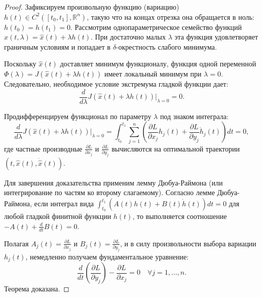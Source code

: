 \begin{proof}
    Зафиксируем произвольную функцию (вариацию) $h(t) \in C^2([t_0, t_1], \mathbb{R}^n)$, такую что на концах отрезка она обращается в ноль: $h(t_0) = h(t_1) = 0$.
    Рассмотрим однопараметрическое семейство функций $x(t, \lambda) = \hat{x}(t) + \lambda h(t)$. При достаточно малых $\lambda$ эта функция
    удовлетворяет граничным условиям и попадает в $\delta$-окрестность слабого минимума.
    
    Поскольку $\hat{x}(t)$ доставляет минимум функционалу, функция одной переменной $\Phi(\lambda) = J(\hat{x}(t) + \lambda h(t))$ имеет локальный минимум при $\lambda = 0$.
    Следовательно, необходимое условие экстремума гладкой функции дает:
    \begin{equation}
        \frac{d}{d\lambda} J(\hat{x}(t) + \lambda h(t)) \bigg|_{\lambda = 0} = 0.
    \end{equation}
    
    Продифференцируем функционал по параметру $\lambda$ под знаком интеграла:
    \begin{equation}
        \frac{d}{d\lambda} J(\hat{x}(t) + \lambda h(t)) \bigg|_{\lambda=0} = \int_{t_0}^{t_1} \sum_{j=1}^n \left( \frac{\partial L}{\partial x_j} h_j(t) + \frac{\partial L}{\partial y_j} \dot{h}_j(t) \right) dt = 0,
    \end{equation}
    где частные производные $\frac{\partial L}{\partial x_j}$ и $\frac{\partial L}{\partial y_j}$ вычисляются на оптимальной траектории $(t, \hat{x}(t), \dot{\hat{x}}(t))$.

    Для завершения доказательства применим лемму Дюбуа-Раймона (или интегрирование по частям ко второму слагаемому).
    Согласно лемме Дюбуа-Раймона, если интеграл вида $\int_{t_0}^{t_1} (A(t)h(t) + B(t)\dot{h}(t)) dt = 0$ для любой гладкой финитной функции $h(t)$,
    то выполняется соотношение $-A(t) + \frac{d}{dt}B(t) = 0$. 
    
    Полагая $A_j(t) = \frac{\partial L}{\partial x_j}$ и $B_j(t) = \frac{\partial L}{\partial y_j}$, и в силу произвольности выбора вариации $h_j(t)$, немедленно получаем фундаментальное уравнение:
    \begin{equation}
        \frac{d}{dt}\left( \frac{\partial L}{\partial y_j} \right) - \frac{\partial L}{\partial x_j} = 0 \quad \forall j = 1, \dots, n.
    \end{equation}
    Теорема доказана.
\end{proof}
